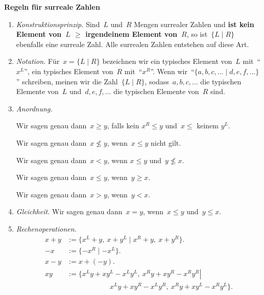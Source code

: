 \documentclass[a4paper,ngerman,landscape,16pt]{scrartcl}
\newcommand{\sur}[2]{\{ #1 \mathrel{|} #2 \}}
\newcommand{\hil}[1]{\textcolor{hicolor}{#1}}
\newenvironment{block}[1]{
  \begin{center}\textbf{#1}\end{center}
}{}
\begin{document}
\thispagestyle{empty}

\sffamily

\begin{block}{Regeln für surreale Zahlen}
\renewcommand{\labelenumi}{\arabic{enumi}.}
\begin{enumerate}
\item \emph{Konstruktionsprinzip.}
Sind~$L$ und~$R$ Mengen surrealer Zahlen und \hil{\textbf{ist kein Element von~$L$
$\geq$ irgendeinem Element von~$R$}}, so ist~$\sur{L}{R}$ ebenfalls eine surreale
Zahl. Alle surrealen Zahlen entstehen auf diese Art.

\item \emph{Notation.}
Für~$x = \sur{L}{R}$ bezeichnen wir ein typisches Element von~$L$
mit~"`$x^L$"', ein typisches Element von~$R$ mit~"`$x^R$"'. Wenn
wir~"`$\sur{a,b,c,\ldots}{d,e,f,\ldots}$"' schreiben, meinen wir die
Zahl~$\sur{L}{R}$, sodass~$a,b,c,\ldots$ die typischen Elemente von~$L$
und~$d,e,f,\ldots$ die typischen Elemente von~$R$ sind.

\item \emph{Anordnung.}

Wir sagen genau dann~$x \geq y$, falls kein $x^R \leq y$ und~$x \leq$
keinem $y^L$.

Wir sagen genau dann~$x \not\leq y$, wenn~$x \leq y$ nicht gilt.

Wir sagen genau dann~$x < y$, wenn $x \leq y$ und~$y \not\leq x$.

Wir sagen genau dann~$x \leq y$, wenn~$y \geq x$.

Wir sagen genau dann~$x > y$, wenn~$y < x$.

\item \emph{Gleichheit.}
Wir sagen genau dann~$x = y$, wenn~$x \leq y$ und~$y \leq x$.

\item \emph{Rechenoperationen.}
\begin{align*}
  x + y &:= \sur{x^L + y,\ x + y^L}{x^R + y,\ x + y^R}. \\
  -x &:= \sur{-x^R}{-x^L}. \\
  x - y &:= x + (-y). \\
  xy &:= \sur{x^Ly + xy^L - x^Ly^L,\ x^Ry + xy^R - x^Ry^R}{\\&\qquad\qquad\qquad x^Ly + xy^R -
x^Ly^R,\ x^Ry + xy^L - x^Ry^L}.
\end{align*}
\end{enumerate}
\end{block}
\end{document}
